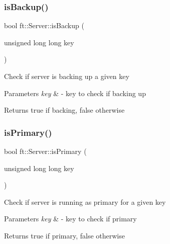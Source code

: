 \mbox{\label{classft_1_1Server_aae86da697b404a1337b94b2a1ee7d5ed}} 
\subsubsection{\texorpdfstring{is\+Backup()}{isBackup()}}
{\footnotesize\ttfamily bool ft\+::\+Server\+::is\+Backup (\begin{DoxyParamCaption}\item[{unsigned long long}]{key }\end{DoxyParamCaption})}

Check if server is backing up a given key


\begin{DoxyParams}{Parameters}
{\em key} & -\/ key to check if backing up\\
\hline
\end{DoxyParams}
\begin{DoxyReturn}{Returns}
true if backing, false otherwise 
\end{DoxyReturn}
\mbox{\label{classft_1_1Server_ac3c476b8dad7bbb3fb39470c79dc2a6e}} 
\subsubsection{\texorpdfstring{is\+Primary()}{isPrimary()}}
{\footnotesize\ttfamily bool ft\+::\+Server\+::is\+Primary (\begin{DoxyParamCaption}\item[{unsigned long long}]{key }\end{DoxyParamCaption})}

Check if server is running as primary for a given key


\begin{DoxyParams}{Parameters}
{\em key} & -\/ key to check if primary\\
\hline
\end{DoxyParams}
\begin{DoxyReturn}{Returns}
true if primary, false otherwise 
\end{DoxyReturn}
\mbox{\label{classft_1_1Server_a17e80f813ff788007ece482e5d311ffa}} 
